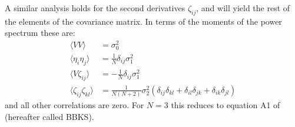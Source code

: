 \documentclass[12pt]{article}
\newcommand{\SH}[1]{\textcolor{brown}{[{\bf SH}: #1]}}
\begin{document}
A similar analysis holds for the second derivatives $\zeta_{ij}$, and will yield the rest of the elements of the covariance matrix. In terms of the moments of the power spectrum these are:
%
\begin{equation} \label{corr}
\begin{split}
\langle VV \rangle &= \sigma_0^2 \\
\langle\eta_i\eta_j\rangle &= \frac{1}{N}\delta_{ij}\sigma_1^2 \\
\langle V\zeta_{ij}\rangle &= -\frac{1}{N}\delta_{ij}\sigma_1^2 \\
\langle\zeta_{ij}\zeta_{kl}\rangle &= \frac{1}{N(N+2)}\sigma_2^2(\delta_{ij}\delta_{kl}+\delta_{il}\delta_{jk}+\delta_{ik}\delta_{jl})
\end{split}
\end{equation}
%
and all other correlations are zero. For $N=3$ this reduces to equation A1 of \cite{BBKS} (hereafter called BBKS). 




\end{document}
